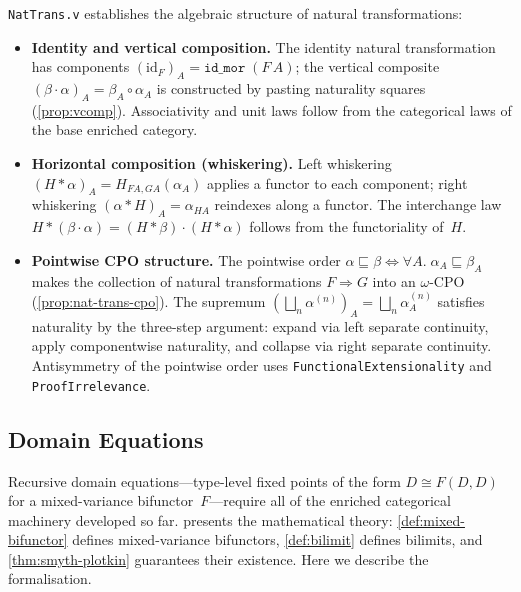 \texttt{NatTrans.v} establishes the algebraic structure of
natural transformations:
\begin{itemize}
  \item \textbf{Identity and vertical composition.}
    The identity natural transformation has components
    $(\mathrm{id}_F)_A = \texttt{id\_mor}\;(F\,A)$; the vertical
    composite $(\beta \cdot \alpha)_A = \beta_A \circ \alpha_A$ is
    constructed by pasting naturality squares
    (\cref{prop:vcomp}).  Associativity and unit laws follow from the
    categorical laws of the base enriched category.
  \item \textbf{Horizontal composition (whiskering).}
    Left whiskering $(H * \alpha)_A = H_{FA,GA}(\alpha_A)$ applies a
    functor to each component; right whiskering
    $(\alpha * H)_A = \alpha_{HA}$ reindexes along a functor.
    The interchange law
    $H * (\beta \cdot \alpha) = (H * \beta) \cdot (H * \alpha)$
    follows from the functoriality of~$H$.
  \item \textbf{Pointwise CPO structure.}
    The pointwise order
    $\alpha \sqsubseteq \beta \iff \forall A.\;
    \alpha_A \sqsubseteq \beta_A$ makes the collection of
    natural transformations $F \Rightarrow G$ into an $\omega$-CPO
    (\cref{prop:nat-trans-cpo}).
    The supremum $(\bigsqcup_n \alpha^{(n)})_A =
    \bigsqcup_n \alpha^{(n)}_A$ satisfies naturality by the
    three-step argument: expand via left separate continuity, apply
    componentwise naturality, and collapse via right separate
    continuity.  Antisymmetry of the pointwise order uses
    \texttt{FunctionalExtensionality} and
    \texttt{ProofIrrelevance}.
\end{itemize}

\subsection{Domain Equations}
\label{sec:meth-domain-equations}


Recursive domain equations---type-level fixed points of the form
$D \cong F(D, D)$ for a mixed-variance bifunctor~$F$---require
all of the enriched categorical machinery developed so far.
 presents the mathematical theory:
\cref{def:mixed-bifunctor} defines mixed-variance bifunctors,
\cref{def:bilimit} defines bilimits, and
\cref{thm:smyth-plotkin} guarantees their existence.
Here we describe the formalisation.

